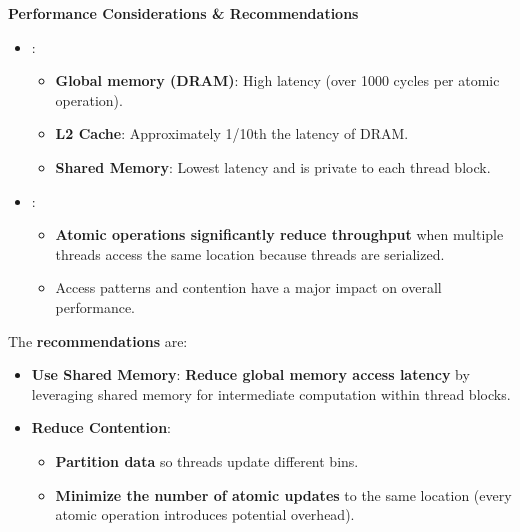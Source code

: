 \begin{itemize}
    \begin{flushleft}
        \textcolor{Green3}{\faIcon{\speedIcon} \textbf{Performance Considerations \& Recommendations}}
    \end{flushleft}
    \begin{itemize}
        \item {}:
        \begin{itemize}
            \item[\textcolor{Red2}{\faIcon{walking}}] \textcolor{Red2}{\textbf{Global memory (DRAM)}}: High latency (over 1000 cycles per atomic operation).
            \item[\textcolor{Green3}{\faIcon{running}}] \textcolor{Green3}{\textbf{L2 Cache}}: Approximately 1/10th the latency of DRAM.
            \item[\textcolor{Green3}{\faIcon{\speedIcon}}] \textcolor{Green3}{\textbf{Shared Memory}}: Lowest latency and is private to each thread block.
        \end{itemize}
        \item {}:
        \begin{itemize}
            \item \textbf{Atomic operations significantly reduce throughput} when multiple threads access the same location because threads are serialized.
            \item Access patterns and contention have a major impact on overall performance.
        \end{itemize}
    \end{itemize}
    The \textbf{recommendations} are:
    \begin{itemize}[label=\textcolor{Green3}{}]
        \item \textcolor{Green3}{\textbf{Use Shared Memory}}: \textbf{Reduce global memory access latency} by leveraging shared memory for intermediate computation within thread blocks.
        \item \textcolor{Green3}{\textbf{Reduce Contention}}:
        \begin{itemize}
            \item \textbf{Partition data} so threads update different bins.
            \item \textbf{Minimize the number of atomic updates} to the same location (every atomic operation introduces potential overhead).
        \end{itemize}
    \end{itemize}


\end{itemize}
